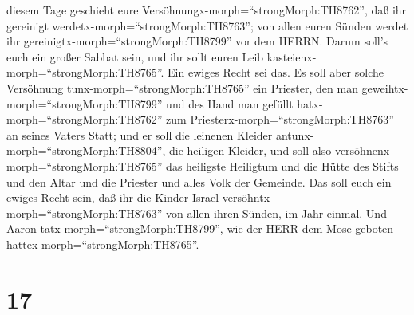diesem Tage geschieht eure Versöhnungx-morph=``strongMorph:TH8762'', daß
ihr gereinigt werdetx-morph=``strongMorph:TH8763''; von allen euren
Sünden werdet ihr gereinigtx-morph=``strongMorph:TH8799'' vor dem HERRN.
 Darum soll's euch ein großer Sabbat sein, und ihr sollt
euren Leib kasteienx-morph=``strongMorph:TH8765''. Ein ewiges Recht sei
das.  Es soll aber solche Versöhnung
tunx-morph=``strongMorph:TH8765'' ein Priester, den man
geweihtx-morph=``strongMorph:TH8799'' und des Hand man gefüllt
hatx-morph=``strongMorph:TH8762'' zum
Priesterx-morph=``strongMorph:TH8763'' an seines Vaters Statt; und er
soll die leinenen Kleider antunx-morph=``strongMorph:TH8804'', die
heiligen Kleider,  und soll also
versöhnenx-morph=``strongMorph:TH8765'' das heiligste Heiligtum und die
Hütte des Stifts und den Altar und die Priester und alles Volk der
Gemeinde.  Das soll euch ein ewiges Recht sein, daß ihr die
Kinder Israel versöhntx-morph=``strongMorph:TH8763'' von allen ihren
Sünden, im Jahr einmal. Und Aaron tatx-morph=``strongMorph:TH8799'', wie
der HERR dem Mose geboten hattex-morph=``strongMorph:TH8765''.

\hypertarget{section-16}{%
\section{17}\label{section-16}}

